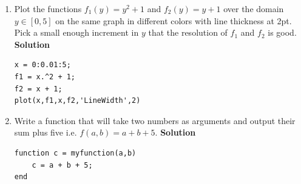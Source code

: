 \documentclass[letterpaper, fontsize=11pt]{scrartcl} %
\numberwithin{equation}{section} %
\numberwithin{figure}{section} %
\numberwithin{table}{section} %
\begin{document}
\begin{enumerate}
\begin{enumerate}
\item Plot the functions $f_1(y) = y^2 + 1$ and $f_2(y) = y + 1$ over the domain $y \in [0,5]$ on the same graph in different colors with line thickness at 2pt. Pick a small enough increment in $y$ that the resolution of $f_1$ and $f_2$ is good. \newline
\textbf{Solution}
\begin{lstlisting} 
x = 0:0.01:5;
f1 = x.^2 + 1; 
f2 = x + 1;
plot(x,f1,x,f2,'LineWidth',2)
\end{lstlisting}
\item Write a function that will take two numbers as arguments and output their sum plus five i.e. $f(a,b) = a + b + 5$.  \newline
\textbf{Solution}
\begin{lstlisting} 
function c = myfunction(a,b)
	c = a + b + 5;
end
\end{lstlisting}

\end{enumerate}

\end{enumerate}

\end{document}
